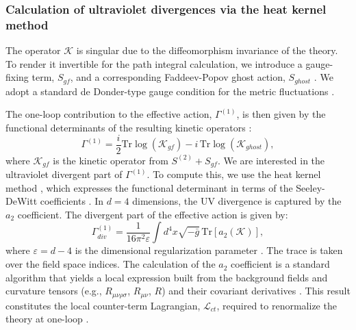 \documentclass[twocolumn]{aastex631}
\begin{document}
\subsubsection{Calculation of ultraviolet divergences via the heat kernel method}
The operator $\mathcal{K}$ is singular due to the diffeomorphism invariance of the theory. To render it invertible for the path integral calculation, we introduce a gauge-fixing term, $S_{gf}$, and a corresponding Faddeev-Popov ghost action, $S_{ghost}$  \citep{jakobsen2020schwarzschildtangherlinimetricscatteringamplitudes,kugo2022covariantbrstquantizationunimodular}. We adopt a standard de Donder-type gauge condition for the metric fluctuations  \citep{jakobsen2020schwarzschildtangherlinimetricscatteringamplitudes,dolan2022gravitationalperturbationsrotatingblack}.

The one-loop contribution to the effective action, $\Gamma^{(1)}$, is then given by the functional determinants of the resulting kinetic operators  \citep{jakobsen2020schwarzschildtangherlinimetricscatteringamplitudes}:
\begin{equation}\Gamma^{(1)} = \frac{i}{2} \text{Tr} \log(\mathcal{K}_{gf}) - i \, \text{Tr} \log(\mathcal{K}_{ghost}),\end{equation}
where $\mathcal{K}_{gf}$ is the kinetic operator from $S^{(2)} + S_{gf}$. We are interested in the ultraviolet divergent part of $\Gamma^{(1)}$. To compute this, we use the heat kernel method \citep{shoji2025regularizationfunctionaldeterminantsradial,mehta2025heatkernelmethodsfirstorder,carosi2026equivalentmethodsfunctionaldeterminants}, which expresses the functional determinant in terms of the Seeley-DeWitt coefficients \citep{zingg2019modifiedheatequationsanalytic,shoji2025regularizationfunctionaldeterminantsradial}. In $d=4$ dimensions, the UV divergence is captured by the $a_2$ coefficient. The divergent part of the effective action is given by:
\begin{equation}\Gamma^{(1)}_{div} = \frac{1}{16\pi^2 \varepsilon} \int d^4x \sqrt{-\bar{g}} \, \text{Tr}[a_2(\mathcal{K})],\end{equation}
where $\varepsilon = d-4$ is the dimensional regularization parameter \citep{béluscamaïto2020dimensionalregularizationbreitenlohnermaison,solera2026symmetryrestoringfinitecountertermssmeft}. The trace is taken over the field space indices. The calculation of the $a_2$ coefficient is a standard algorithm that yields a local expression built from the background fields and curvature tensors (e.g., $R_{\mu\nu\rho\sigma}$, $R_{\mu\nu}$, $R$) and their covariant derivatives \citep{pronin1997oneloopcountertermsdimensionalregularization}. This result constitutes the local counter-term Lagrangian, $\mathcal{L}_{ct}$, required to renormalize the theory at one-loop \citep{pronin1997oneloopcountertermsdimensionalregularization,béluscamaïto2020dimensionalregularizationbreitenlohnermaison}.
\end{document}
